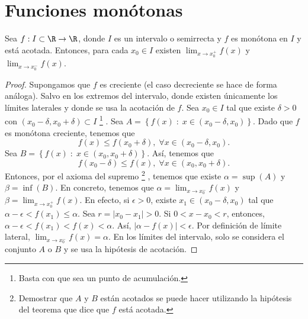 \section{Funciones monótonas}
\begin{ftheorem}[]
\normalfont Sea $\displaystyle f : I \subset \R \to \R $, donde $\displaystyle I $ es un intervalo o semirrecta y $\displaystyle f $ es monótona en $\displaystyle I $ y está acotada. Entonces, para cada $\displaystyle x_{0} \in I $ existen $\displaystyle \lim_{x \to x_{0}^{+}}f\left(x\right) $ y $\displaystyle \lim_{x \to x_{0}^{-}}f\left(x\right) $.
\end{ftheorem}
\begin{proof}
	Supongamos que $\displaystyle f $ es creciente (el caso decreciente se hace de forma análoga). Salvo en los extremos del intervalo, donde existen únicamente los límites laterales y donde se usa la acotación de $\displaystyle f $. Sea $\displaystyle x_{0} \in I $ tal que existe $\displaystyle \delta > 0 $ con $\displaystyle \left(x_{0}-\delta, x_{0}+\delta \right)\subset I $ \footnote{Basta con que sea un punto de acumulación.} . Sea $\displaystyle A = \left\{ f\left(x\right) \; : \; x \in \left(x_{0}-\delta, x_{0} \right)\right\}  $. Dado que $\displaystyle f $ es monótona creciente, tenemos que
	\[f\left(x\right) \leq f\left(x_{0} + \delta \right), \; \forall x \in \left(x_{0} - \delta, x_{0}\right) .\]
	Sea $\displaystyle B = \left\{ f\left(x\right) \; : \; x \in \left(x_{0}, x_{0}+\delta \right)\right\}  $. Así, tenemos que 
	\[ f\left(x_{0}-\delta \right)\leq f\left(x\right), \; \forall x \in \left(x_{0}, x_{0}+\delta\right) .\]
Entonces, por el axioma del supremo \footnote{Demostrar que $\displaystyle A $ y $\displaystyle B $ están acotados se puede hacer utilizando la hipótesis del teorema que dice que $\displaystyle f $ está acotada.} , tenemos que existe $\displaystyle \alpha = \sup\left(A\right) $ y $\displaystyle \beta = \inf\left(B\right) $. En concreto, tenemos que $\displaystyle \alpha = \lim_{x \to x_{0}^{-}}f\left(x\right) $ y $\displaystyle \beta = \lim_{x \to x_{0}^{+}}f\left(x\right) $. En efecto, si $\displaystyle \epsilon > 0 $, existe $\displaystyle x_{1} \in \left(x_{0}-\delta, x_{0} \right) $ tal que $\displaystyle \alpha - \epsilon < f\left(x_{1}\right) \leq \alpha  $. Sea $\displaystyle r = \left|x_{0}-x_{1}\right| > 0 $. Si $\displaystyle 0 < x - x_{0} < r $, entonces, $\displaystyle \alpha - \epsilon < f\left(x_{1}\right) < f\left(x\right) < \alpha  $. Así, $\displaystyle \left|\alpha - f\left(x\right)\right| < \epsilon  $. Por definición de límite lateral, $\displaystyle \lim_{x \to x_{0}^{-}}f\left(x\right) = \alpha  $.
En los límites del intervalo, solo se considera el conjunto $\displaystyle A $  o $\displaystyle B $ y se usa la hipótesis de acotación.
\end{proof}
